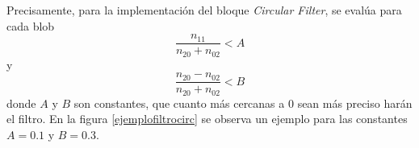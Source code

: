 Precisamente, para la implementación del bloque \emph{Circular Filter}, se evalúa para cada blob $$\frac{n_{11}}{n_{20}+n_{02}}< A$$ y $$\frac{n_{20}-n_{02}}{n_{20}+n_{02}}< B$$ donde $A$ y $B$ son constantes, que cuanto más cercanas a $0$ sean más preciso harán el filtro. En la figura \ref{ejemplofiltrocirc} se observa un ejemplo para las constantes $A = 0.1$ y $B = 0.3$.

\begin{figure}[H]
        \centering
        \hspace{5 mm}

\end{figure}

